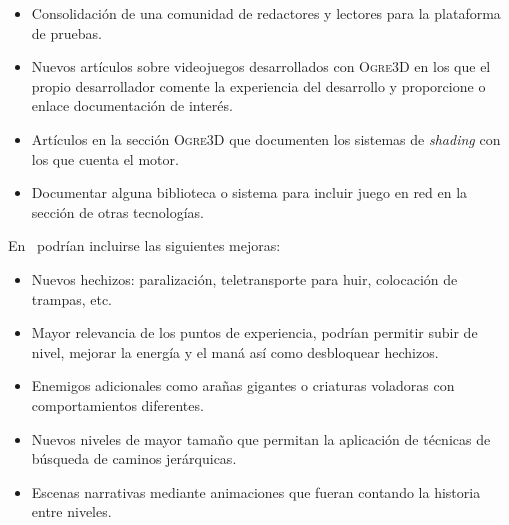 \begin{itemize}
    \item Consolidación de una comunidad de redactores y lectores para
    la plataforma de pruebas.
    \item Nuevos artículos sobre videojuegos desarrollados con \textsc{Ogre3D}
    en los que el propio desarrollador comente la experiencia del desarrollo
    y proporcione o enlace documentación de interés.
    \item Artículos en la sección \textsc{Ogre3D} que documenten los sistemas
    de \textit{shading} con los que cuenta el motor.
    \item Documentar alguna biblioteca o sistema para incluir juego en red en
    la sección de otras tecnologías.\\
\end{itemize}

En \juego\ podrían incluirse las siguientes mejoras:


\begin{itemize}
    \item Nuevos hechizos: paralización, teletransporte para huir, colocación
    de trampas, etc.
    \item Mayor relevancia de los puntos de experiencia, podrían permitir
    subir de nivel, mejorar la energía y el maná así como desbloquear
    hechizos.
    \item Enemigos adicionales como arañas gigantes o criaturas voladoras
    con comportamientos diferentes.
    \item Nuevos niveles de mayor tamaño que permitan la aplicación de
    técnicas de búsqueda de caminos jerárquicas.
    \item Escenas narrativas mediante animaciones que fueran contando
    la historia entre niveles.
\end{itemize}
